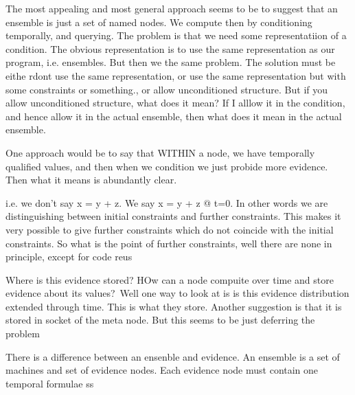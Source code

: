 The most appealing and most general approach seems to be to suggest that an ensemble is just a set of named nodes.  We compute then by conditioning temporally, and querying.  The problem is that we need some representatiion of a condition.  The obvious representation is to use the same representation as our program, i.e. ensembles.  But then we the same problem.  The solution must be eithe rdont use the same representation, or use the same representation but with some constraints or something., or allow unconditioned structure.  But if you allow unconditioned structure, what does it mean?  If I alllow it in the condition, and hence allow it in the actual ensemble, then what does it mean in the actual ensemble.

One approach would be to say that WITHIN a node, we have temporally qualified values, and then when we condition we just probide more evidence.  Then what it means is abundantly clear.

i.e. we don't say x = y + z.  We say x = y + z @ t=0.  In other words we are distinguishing between initial constraints and further constraints.  This makes it very possible to give further constraints which do not coincide with the initial constraints.
So what is the point of further constraints, well there are none in principle, except for code reus

Where is this evidence stored?  HOw can a node compuite over time and store evidence about its values?\
Well one way to look at is is this evidence distribution
extended through time.  This is what they store.
Another suggestion is that it is stored in socket of the meta node.  But this seems to be just deferring the problem

There is a difference between an ensenble and evidence.  An ensemble is a set of machines and set of evidence nodes.  Each evidence node must contain one temporal formulae
ss